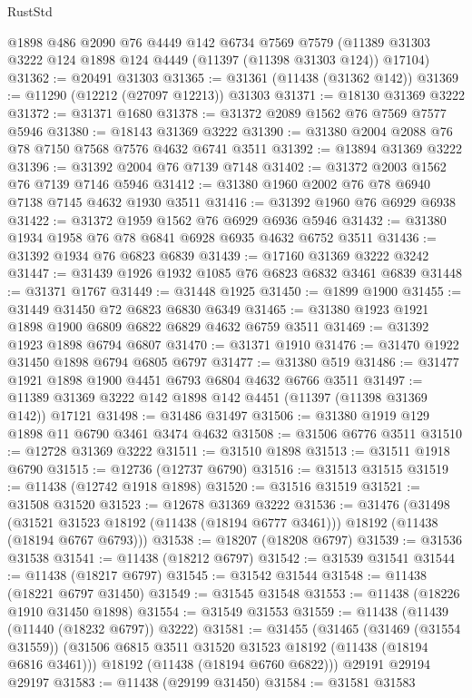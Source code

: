 \begin{lexlean}{RustStd}
\begin{coremodule}
    @1898
    @486
    @2090
    @76
    @4449
    @142
    @6734
    @7569
    @7579
    (@11389 @31303 @3222 @124 @1898 @124 @4449 (@11397 (@11398 @31303 @124)) @17104)
@31362 := @20491 @31303
@31365 := @31361 (@11438 (@31362 @142))
@31369 := @11290 (@12212 (@27097 @12213)) @31303
@31371 := @18130 @31369 @3222
@31372 := @31371 @1680
@31378 := @31372 @2089 @1562 @76 @7569 @7577 @5946
@31380 := @18143 @31369 @3222
@31390 := @31380 @2004 @2088 @76 @78 @7150 @7568 @7576 @4632 @6741 @3511
@31392 := @13894 @31369 @3222
@31396 := @31392 @2004 @76 @7139 @7148
@31402 := @31372 @2003 @1562 @76 @7139 @7146 @5946
@31412 := @31380 @1960 @2002 @76 @78 @6940 @7138 @7145 @4632 @1930 @3511
@31416 := @31392 @1960 @76 @6929 @6938
@31422 := @31372 @1959 @1562 @76 @6929 @6936 @5946
@31432 := @31380 @1934 @1958 @76 @78 @6841 @6928 @6935 @4632 @6752 @3511
@31436 := @31392 @1934 @76 @6823 @6839
@31439 := @17160 @31369 @3222 @3242
@31447 := @31439 @1926 @1932 @1085 @76 @6823 @6832 @3461 @6839
@31448 := @31371 @1767
@31449 := @31448 @1925
@31450 := @1899 @1900
@31455 := @31449 @31450 @72 @6823 @6830 @6349
@31465 := @31380 @1923 @1921 @1898 @1900 @6809 @6822 @6829 @4632 @6759 @3511
@31469 := @31392 @1923 @1898 @6794 @6807
@31470 := @31371 @1910
@31476 := @31470 @1922 @31450 @1898 @6794 @6805 @6797
@31477 := @31380 @519
@31486 := @31477 @1921 @1898 @1900 @4451 @6793 @6804 @4632 @6766 @3511
@31497 := @11389 @31369 @3222 @142 @1898 @142 @4451 (@11397 (@11398 @31369 @142)) @17121
@31498 := @31486 @31497
@31506 := @31380 @1919 @129 @1898 @11 @6790 @3461 @3474 @4632
@31508 := @31506 @6776 @3511
@31510 := @12728 @31369 @3222
@31511 := @31510 @1898
@31513 := @31511 @1918 @6790
@31515 := @12736 (@12737 @6790)
@31516 := @31513 @31515
@31519 := @11438 (@12742 @1918 @1898)
@31520 := @31516 @31519
@31521 := @31508 @31520
@31523 := @12678 @31369 @3222
@31536 := @31476
    (@31498
      (@31521 @31523 @18192 (@11438 (@18194 @6777 @3461)))
      @18192
      (@11438 (@18194 @6767 @6793)))
@31538 := @18207 (@18208 @6797)
@31539 := @31536 @31538
@31541 := @11438 (@18212 @6797)
@31542 := @31539 @31541
@31544 := @11438 (@18217 @6797)
@31545 := @31542 @31544
@31548 := @11438 (@18221 @6797 @31450)
@31549 := @31545 @31548
@31553 := @11438 (@18226 @1910 @31450 @1898)
@31554 := @31549 @31553
@31559 := @11438 (@11439 (@11440 (@18232 @6797)) @3222)
@31581 := @31455
    (@31465
      (@31469 (@31554 @31559))
      (@31506 @6815 @3511 @31520 @31523 @18192 (@11438 (@18194 @6816 @3461)))
      @18192
      (@11438 (@18194 @6760 @6822)))
    @29191
    @29194
    @29197
@31583 := @11438 (@29199 @31450)
@31584 := @31581 @31583

\end{coremodule}
\end{lexlean}
